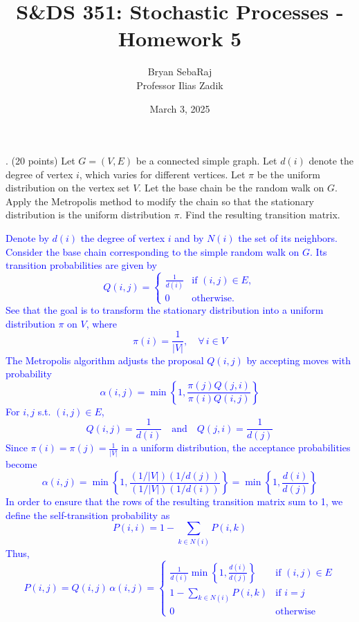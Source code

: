 \documentclass{article}
\title{S\&DS 351: Stochastic Processes - Homework 5}
\author{Bryan SebaRaj \\[0.8em] Professor Ilias Zadik}
\date{March 3, 2025}
\begin{document}
\maketitle

. (20 points) Let $G = (V, E)$ be a connected simple graph. Let $d(i)$ denote the degree of vertex $i$, which varies for different vertices. Let $\pi$ be the uniform distribution on the vertex set $V$. Let the base chain be the random walk on $G$. Apply the Metropolis method to modify the chain so that the stationary distribution is the uniform distribution $\pi$. Find the resulting transition matrix.

\textcolor{blue}{
    Denote by \( d(i) \) the degree of vertex \( i \) and by \( N(i) \) the set of its neighbors. Consider the base chain corresponding to the simple random walk on \( G \). Its transition probabilities are given by
\[
Q(i,j) =
\begin{cases}
\frac{1}{d(i)} & \text{if } (i,j) \in E, \\
0 & \text{otherwise.}
\end{cases}
\]
See that the goal is to transform the stationary distribution into a uniform distribution \(\pi\) on \(V\), where
\[
\pi(i)=\frac{1}{|V|}, \quad \forall\, i\in V
\]
The Metropolis algorithm adjusts the proposal \( Q(i,j) \) by accepting moves with probability
\[
\alpha(i,j) = \min\left\{ 1, \frac{\pi(j) Q(j,i)}{\pi(i) Q(i,j)} \right\}
\]
For \( i,j \) s.t. \( (i,j) \in E \),
\[
Q(i,j) = \frac{1}{d(i)} \quad \text{and} \quad Q(j,i) = \frac{1}{d(j)}
\]
Since \(\pi(i)=\pi(j)=\frac{1}{|V|}\) in a uniform distribution, the acceptance probabilities become
\[
\alpha(i,j) = \min\left\{ 1, \frac{(1/|V|)(1/d(j))}{(1/|V|)(1/d(i))} \right\} 
= \min\left\{ 1, \frac{d(i)}{d(j)} \right\}
\]
In order to ensure that the rows of the resulting transition matrix sum to 1, we define the self-transition probability as
\[
P(i,i) = 1 - \sum_{k \in N(i)} P(i,k)
\]
Thus, 
\[
P(i,j) = Q(i,j)\,\alpha(i,j) =
\begin{cases}
\frac{1}{d(i)} \min\left\{ 1, \frac{d(i)}{d(j)} \right\} & \text{if } (i,j)\in E \\
1 - \sum_{k \in N(i)} P(i,k) & \text{if } i=j \\
0 & \text{otherwise}
\end{cases}
\]
\medskip
}
\end{document}
